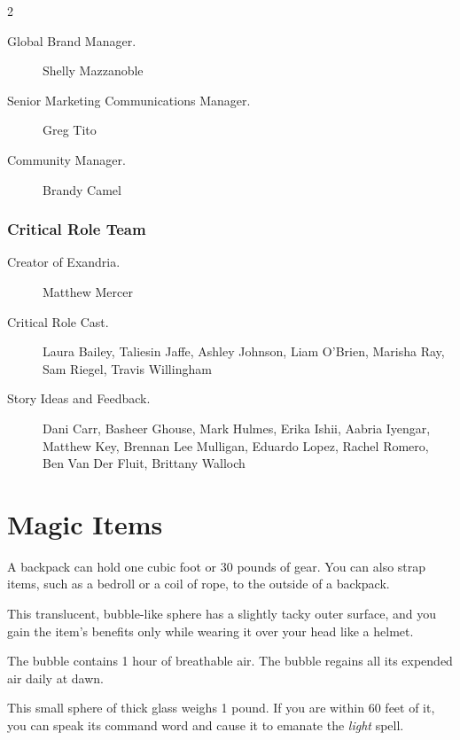 \documentclass[10pt,a4paper,twoside,fancy,bg=print,twocolumn,openany,nodeprecatedcode]{dndbook}
\begin{document}
\begin{description}
\begin{multicols}{2}
\begin{description}
\item[Global Brand Manager.]
Shelly Mazzanoble

\item[Senior Marketing Communications Manager.]
Greg Tito

\item[Community Manager.]
Brandy Camel

\end{description}

\subsection{Critical Role Team}

\begin{description}
\item[Creator of Exandria.]
Matthew Mercer

\item[Critical Role Cast.]
Laura Bailey, Taliesin Jaffe, Ashley Johnson, Liam O'Brien, Marisha Ray, Sam Riegel, Travis Willingham

\item[Story Ideas and Feedback.]
Dani Carr, Basheer Ghouse, Mark Hulmes, Erika Ishii, Aabria Iyengar, Matthew Key, Brennan Lee Mulligan, Eduardo Lopez, Rachel Romero, Ben Van Der Fluit, Brittany Walloch

\end{description}

\end{multicols}

\end{description}

\chapter{Magic Items}
A backpack can hold one cubic foot or 30 pounds of gear. You can also strap items, such as a bedroll or a coil of rope, to the outside of a backpack.

This translucent, bubble-like sphere has a slightly tacky outer surface, and you gain the item's benefits only while wearing it over your head like a helmet.

The bubble contains 1 hour of breathable air. The bubble regains all its expended air daily at dawn.

This small sphere of thick glass weighs 1 pound. If you are within 60 feet of it, you can speak its command word and cause it to emanate the \textit{light} spell.
\end{document}
